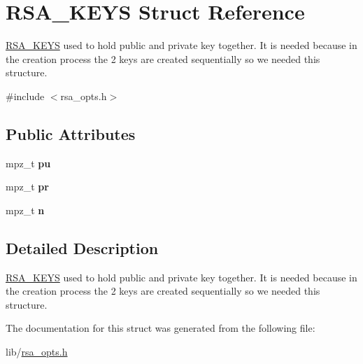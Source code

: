 \hypertarget{struct_r_s_a___k_e_y_s}{\section{R\-S\-A\-\_\-\-K\-E\-Y\-S Struct Reference}
\label{struct_r_s_a___k_e_y_s}
}


\hyperlink{struct_r_s_a___k_e_y_s}{R\-S\-A\-\_\-\-K\-E\-Y\-S} used to hold public and private key together. It is needed because in the creation process the 2 keys are created sequentially so we needed this structure.  




{\ttfamily \#include $<$rsa\-\_\-opts.\-h$>$}

\subsection*{Public Attributes}
\begin{DoxyCompactItemize}
\item 
\hypertarget{struct_r_s_a___k_e_y_s_ae195bb55be04663a9934cf8966c0c092}{mpz\-\_\-t {\bfseries pu}}\label{struct_r_s_a___k_e_y_s_ae195bb55be04663a9934cf8966c0c092}

\item 
\hypertarget{struct_r_s_a___k_e_y_s_a7ce7519d17187ff2ac2e6d6823a0228b}{mpz\-\_\-t {\bfseries pr}}\label{struct_r_s_a___k_e_y_s_a7ce7519d17187ff2ac2e6d6823a0228b}

\item 
\hypertarget{struct_r_s_a___k_e_y_s_af1419f31245c25d21873d10591c1889b}{mpz\-\_\-t {\bfseries n}}\label{struct_r_s_a___k_e_y_s_af1419f31245c25d21873d10591c1889b}

\end{DoxyCompactItemize}


\subsection{Detailed Description}
\hyperlink{struct_r_s_a___k_e_y_s}{R\-S\-A\-\_\-\-K\-E\-Y\-S} used to hold public and private key together. It is needed because in the creation process the 2 keys are created sequentially so we needed this structure. 

The documentation for this struct was generated from the following file\-:\begin{DoxyCompactItemize}
\item 
lib/\hyperlink{rsa__opts_8h}{rsa\-\_\-opts.\-h}\end{DoxyCompactItemize}
